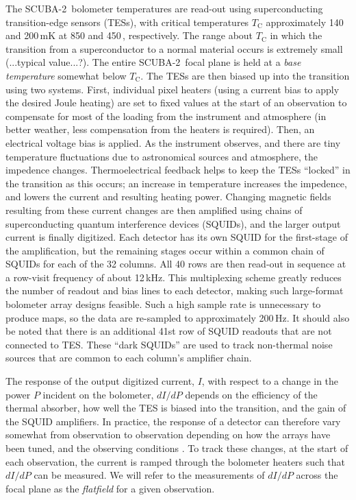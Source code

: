 \documentclass[useAMS,usenatbib,nofootinbib]{mn2e}
\newcommand{\scuba}{SCUBA-2}
\begin{document}
The \scuba\ bolometer temperatures are read-out using superconducting
transition-edge sensors (TESs), with critical temperatures
$T_\mathrm{C}$ approximately 140 and 200\,mK at 850 and 450\,\micron,
respectively. The range about $T_\mathrm{C}$ in which the transition
from a superconductor to a normal material occurs is extremely small
(...typical value...?). The entire \scuba\ focal plane is held at a
\emph{base temperature} somewhat below $T_\mathrm{C}$. The TESs are
then biased up into the transition using two systems. First,
individual pixel heaters (using a current bias to apply the desired
Joule heating) are set to fixed values at the start of an observation
to compensate for most of the loading from the instrument and
atmosphere (in better weather, less compensation from the heaters is
required). Then, an electrical voltage bias is applied. As the
instrument observes, and there are tiny temperature fluctuations due
to astronomical sources and atmosphere, the impedence
changes. Thermoelectrical feedback helps to keep the TESs ``locked''
in the transition as this occurs; an increase in temperature increases
the impedence, and lowers the current and resulting heating
power. Changing magnetic fields resulting from these current changes
are then amplified using chains of superconducting quantum
interference devices (SQUIDs), and the larger output current is
finally digitized. Each detector has its own SQUID for the first-stage
of the amplification, but the remaining stages occur within a common
chain of SQUIDs for each of the 32 columns. All 40 rows are then
read-out in sequence at a row-visit frequency of about 12\,kHz. This
multiplexing scheme greatly reduces the number of readout and bias
lines to each detector, making such large-format bolometer array
designs feasible. Such a high sample rate is unnecessary to produce
maps, so the data are re-sampled to approximately 200\,Hz.  It should
also be noted that there is an additional 41st row of SQUID readouts
that are not connected to TES. These ``dark SQUIDs'' are used to track
non-thermal noise sources that are common to each column's amplifier
chain.

The response of the output digitized current, $I$, with respect to a
change in the power $P$ incident on the bolometer, $dI/dP$ depends on
the efficiency of the thermal absorber, how well the TES is biased
into the transition, and the gain of the SQUID amplifiers. In
practice, the response of a detector can therefore vary somewhat from
observation to observation depending on how the arrays have been
tuned, and the observing conditions \citep[see][]{holland2012}. To
track these changes, at the start of each observation, the current is
ramped through the bolometer heaters such that $dI/dP$ can be
measured. We will refer to the measurements of $dI/dP$ across the
focal plane as the \emph{flatfield} for a given observation.
\end{document}
